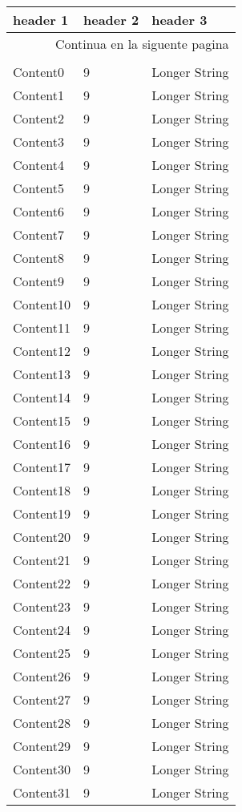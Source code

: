 \documentclass{article}%
\begin{document}
%
\normalsize%
\begin{longtable}{l l l}%
\hline%
header 1&header 2&header 3\\%
\hline%
\endhead%
\hline%
\multicolumn{3}{r}{Continua en la siguente pagina}\\%
\hline%
\endfoot%
\hline%
\multicolumn{3}{r}{Fin de Tabla}\\%
\hline%
\endlastfoot%
Content0&9&Longer String\\%
Content1&9&Longer String\\%
Content2&9&Longer String\\%
Content3&9&Longer String\\%
Content4&9&Longer String\\%
Content5&9&Longer String\\%
Content6&9&Longer String\\%
Content7&9&Longer String\\%
Content8&9&Longer String\\%
Content9&9&Longer String\\%
Content10&9&Longer String\\%
Content11&9&Longer String\\%
Content12&9&Longer String\\%
Content13&9&Longer String\\%
Content14&9&Longer String\\%
Content15&9&Longer String\\%
Content16&9&Longer String\\%
Content17&9&Longer String\\%
Content18&9&Longer String\\%
Content19&9&Longer String\\%
Content20&9&Longer String\\%
Content21&9&Longer String\\%
Content22&9&Longer String\\%
Content23&9&Longer String\\%
Content24&9&Longer String\\%
Content25&9&Longer String\\%
Content26&9&Longer String\\%
Content27&9&Longer String\\%
Content28&9&Longer String\\%
Content29&9&Longer String\\%
Content30&9&Longer String\\%
Content31&9&Longer String\\%

\end{longtable}
\end{document}
